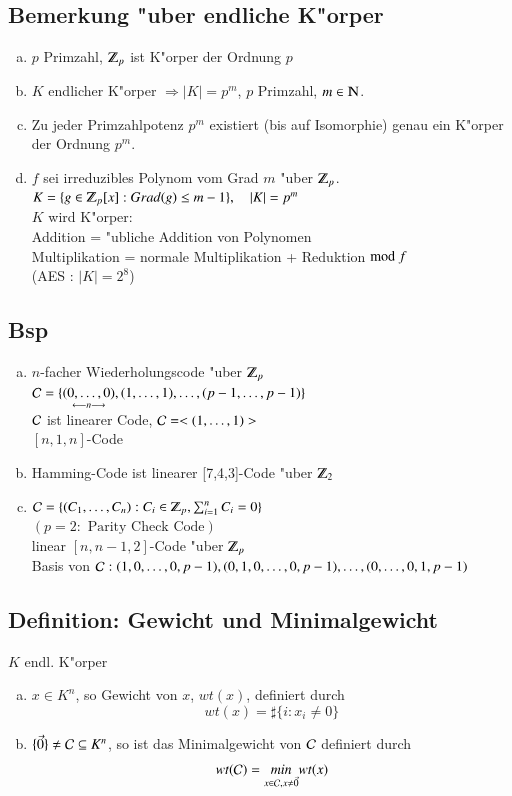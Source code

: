 \subsection{Bemerkung "uber endliche K"orper}
\begin{enumerate}[a)]
	\item $p$ Primzahl, $\Z_p$ ist K"orper der Ordnung $p$
	\item $K$ endlicher K"orper $\Rightarrow \left| K \right| = p^m$, $p$ Primzahl, $m \in \N$.
	\item Zu jeder Primzahlpotenz $p^m$ existiert (bis auf Isomorphie) genau ein K"orper der Ordnung $p^m$.
	\item $f$ sei irreduzibles Polynom vom Grad $m$ "uber $\Z_p$.\\
	 $K=\lbrace g \in \Z_p [x] : Grad(g) \leq m-1 \rbrace, \quad \left| K \right| = p^m$\\
	$K$ wird K"orper:\\
	Addition = "ubliche Addition von Polynomen \\
	Multiplikation = normale Multiplikation + Reduktion $\text{mod }f$ \\
	(AES : $\left| K \right| = 2^8$)
\end{enumerate}

\subsection{Bsp}
\begin{enumerate}[a)]
	\item $n$-facher Wiederholungscode "uber $\Z_p$\\
	$\mathcal{C}=\lbrace \underset{\longleftarrow n \longrightarrow}{(0,\ldots,0)},(1,\ldots,1),\ldots,(p-1,\ldots,p-1)\rbrace$\\
	$\mathcal{C}$ ist linearer Code, $\mathcal{C}=<(1,\ldots,1)>$\\
	$[n,1,n]$-Code
	\item Hamming-Code ist linearer [7,4,3]-Code "uber $\Z_2$
	\item $\Code = \lbrace (C_1,\ldots,C_n) : C_i \in \Z_p,\sum^n_{i=1}{C_i}=0 \rbrace$ \\
	$(p=2 : \text{ Parity Check Code})$\\
	linear $[n,n-1,2]$-Code "uber $\Z_p$\\
	Basis von $\mathcal{C}:(1,0,\ldots,0,p-1), (0,1,0,\ldots,0,p-1), \ldots, (0,\ldots,0,1,p-1)$
\end{enumerate}
\subsection{Definition: Gewicht und Minimalgewicht}
$K$ endl. K"orper
\begin{enumerate}[a)]
	\item $x \in K^n$, so Gewicht von $x$, $wt(x)$, definiert durch 
	\[
		wt(x)=\sharp \lbrace i:x_i\neq0 \rbrace
	\]
	\item $\lbrace \vec{0} \rbrace \neq \mathcal{C} \subseteq K^n$, so ist das Minimalgewicht von $\mathcal{C}$ definiert durch 
	\[
		wt(\mathcal{C})=\underset{x\in\mathcal{C}, x\neq \vec{0}}{min} wt(x)
	\]
\end{enumerate}

